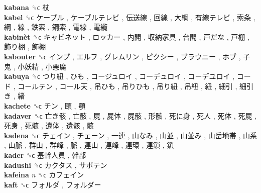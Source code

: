 \textbf{kabana} ␝ϲ   杖   \\
\textbf{kabel} ␝ϲ   ケーブル ,  ケーブルテレビ ,  伝送線 ,  回線 ,  大綱 ,  有線テレビ ,  索条 ,  綱 ,  線 ,  鉄索 ,  鋼索 ,  電線 ,  電纜   \\
\textbf{kabinèt} ␝ϲ   キャビネット ,  ロッカー ,  内閣 ,  収納家具 ,  台閣 ,  戸だな ,  戸棚 ,  飾り棚 ,  飾棚   \\
\textbf{kabouter} ␝ϲ   インプ ,  エルフ ,  グレムリン ,  ピクシー ,  ブラウニー ,  ホブ ,  子鬼 ,  小妖精 ,  小悪魔   \\
\textbf{kabuya} ␝ϲ   つり紐 ,  ひも ,  コージュロイ ,  コーデュロイ ,  コーデユロイ ,  コード ,  コールテン ,  コール天 ,  吊ひも ,  吊りひも ,  吊り紐 ,  吊紐 ,  紐 ,  細引 ,  細引き ,  緒   \\
\textbf{kachete} ␝ϲ   チン ,  頤 ,  顎   \\
\textbf{kadaver} ␝ϲ   亡き骸 ,  亡骸 ,  屍 ,  屍体 ,  屍骸 ,  形骸 ,  死に身 ,  死人 ,  死体 ,  死屍 ,  死身 ,  死骸 ,  遺体 ,  遺骸 ,  骸   \\
\textbf{kadena} ␝ϲ   チェイン ,  チェーン ,  一連 ,  山なみ ,  山並 ,  山並み ,  山岳地帯 ,  山系 ,  山脈 ,  群山 ,  群峰 ,  脈 ,  連山 ,  連峰 ,  連環 ,  連鎖 ,  鎖   \\
\textbf{kader} ␝ϲ   基幹人員 ,  幹部   \\
\textbf{kadushi} ␝ϲ   カクタス ,  サボテン   \\
\textbf{kafeina} \emph{n}  ␝ϲ   カフェイン   \\
\textbf{kaft} ␝ϲ   フォルダ ,  フォルダー   \\
